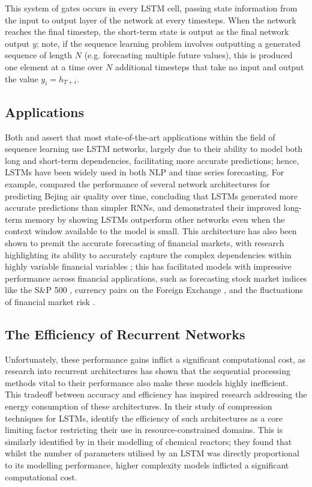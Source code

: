 \documentclass[a4paper, 11pt]{report}
\begin{document}
    This system of gates occurs in every LSTM cell, passing state information from the input to output layer of the network at every timesteps. When the network reaches the final timestep, the short-term state is output as the final network output $y$; note, if the sequence learning problem involves outputting a generated sequence of length $N$ (e.g. forecasting multiple future values), this is produced one element at a time over $N$ additional timesteps that take no input and output the value $y_i = h_{T+i}$.


    \subsection{Applications}

    Both \citet{lipton-2015} and \citet{yu-2019} assert that most state-of-the-art applications within the field of sequence learning use LSTM networks, largely due to their ability to model both long and short-term dependencies, facilitating more accurate predictions; hence, LSTMs have been widely used in both NLP and time series forecasting. For example, \citet{shi-2022} compared the performance of several network architectures for predicting Bejing air quality over time, concluding that LSTMs generated more accurate predictions than simpler RNNs, and demonstrated their improved long-term memory by showing LSTMs outperform other networks even when the context window available to the model is small. This architecture has also been shown to premit the accurate forecasting of financial markets, with research highlighting its ability to accurately capture the complex dependencies within highly variable financial variables \citep{li-2017}; this has facilitated models with impressive performance across financial applications, such as forecasting stock market indices like the S\&P 500 \citep{fjellstrom-2022}, currency pairs on the Foreign Exchange \citep{qi-2021}, and the fluctuations of financial market risk \citep{du-2019}.


    \subsection{The Efficiency of Recurrent Networks}

    Unfortunately, these performance gains inflict a significant computational cost, as research into recurrent architectures has shown that the sequential processing methods vital to their performance also make these models highly inefficient. This tradeoff between accuracy and efficiency has inspired research addressing the energy consumption of these architectures. In their study of compression techniques for LSTMs, \citet{wang-2018} identify the efficiency of such architectures as a core limiting factor restricting their use in resource-constrained domains. This is similarly identified by \citet{zarzycki-2021} in their modelling of chemical reactors; they found that whilst the number of parameters utilised by an LSTM was directly proportional to its modelling performance, higher complexity models inflicted a significant computational cost. 
\end{document}
